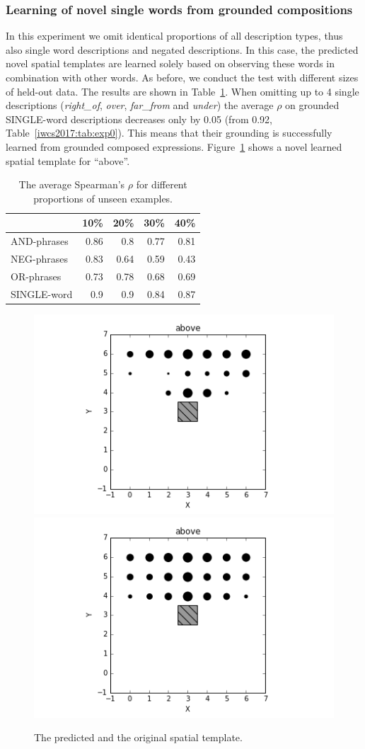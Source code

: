 \subsubsection{Learning of novel single words from grounded compositions}
In this experiment we omit identical proportions of all description types, thus
also single word descriptions and negated descriptions. In this case, the predicted
novel spatial templates are learned solely based on observing these words in
combination with other words. As before, we conduct the test with different sizes
of held-out data. The results are shown in Table~\ref{iwcs2017:tab:exp1-2}. When omitting up to 4 single descriptions (\textit{right\_of}, \textit{over}, \textit{far\_from} and \textit{under}) the average
$\rho$ on grounded SINGLE-word descriptions decreases only by 0.05 (from 0.92, Table~\ref{iwcs2017:tab:exp0}). This
means that their grounding is successfully learned from grounded composed
expressions. Figure~\ref{iwcs2017:fig:exp1:above} shows a novel learned spatial
template for ``above''.

\begin{table}[tbh]
	\centering
	\small
	\begin{tabular}{lrrrr}
	\hline
	{} &   10\% &   20\% &   30\% &   40\% \\
	\hline
	AND-phrases & 0.86 &  0.8 & 0.77 & 0.81 \\
	NEG-phrases & 0.83 & 0.64 & 0.59 & 0.43 \\
	OR-phrases  & 0.73 & 0.78 & 0.68 & 0.69 \\
	SINGLE-word &  0.9 &  0.9 & 0.84 & 0.87 \\
	\hline
	\end{tabular}\vspace{0.5em}
	\caption{The average Spearman's $\rho$ %
	for different proportions of unseen examples.}\label{iwcs2017:tab:exp1-2}
\end{table}
\begin{figure}[tbh]
    \centering
    \includegraphics[width=0.4\linewidth]{studies/iwcs2017/experiment1/above_learned.png}
    \includegraphics[width=0.4\linewidth]{studies/iwcs2017/experiment1/above_trained.png}
    \caption{\label{iwcs2017:fig:exp1:above} The predicted and the original spatial template.}
\end{figure}

